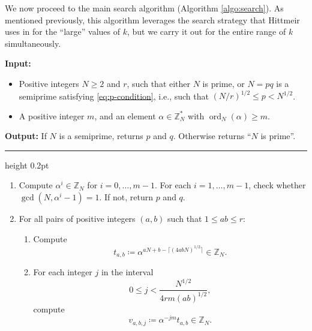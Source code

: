 \documentclass[reqno]{amsart}
\theoremstyle{remark}
\numberwithin{equation}{section}
\numberwithin{thm}{section}
\newcommand{\ZZ}{\mathbb{Z}}
\renewcommand{\leq}{\leqslant}
\renewcommand{\geq}{\geqslant}
\newcommand{\defeq}{\coloneqq}
\DeclareMathOperator{\ord}{ord}
\begin{document}
We now proceed to the main search algorithm (Algorithm \ref{algo:search}).
As mentioned previously, this algorithm leverages the search strategy that
Hittmeir uses in \cite{Hit-timespace} for the ``large'' values of $k$,
but we carry it out for the entire range of $k$ simultaneously.

\begin{myalgorithm}[ht]
\caption{-- the main search}
\label{algo:search}
\begin{flushleft}
\textbf{Input:}
\begin{itemize}[label=--,labelwidth=0.7cm,leftmargin=]
  \item Positive integers $N \geq 2$ and $r$,
  such that either $N$ is prime, or $N = pq$ is a semiprime
  satisfying \eqref{eq:p-condition},
  i.e., such that $(N/r)^{1/2} \leq p < N^{1/2}$.
  \item A positive integer $m$,
  and an element $\alpha \in \ZZ_N^*$ with $\ord_N(\alpha) \geq m$.
\end{itemize}
\textbf{Output:} If $N$ is a semiprime, returns $p$ and $q$. Otherwise returns ``$N$ is prime''.
\end{flushleft}
\vspace{2pt} \hrule height 0.2pt \vspace{1pt}
\begin{enumerate}[label=\arabic*),labelwidth=0.7cm,leftmargin=\labelwidth,itemsep=0.2em]
  \item
  Compute $\alpha^i \in \ZZ_N$ for $i = 0, \ldots, m-1$. 
  For each $i = 1, \ldots, m-1$, check whether $\gcd(N, \alpha^i - 1) = 1$.
  If not, return $p$ and $q$.
  
  \item
  For all pairs of positive integers $(a,b)$ such that $1 \leq ab \leq r$:
  \begin{enumerate}[label=\alph*),itemsep=0.2em]
    \item Compute
    \begin{equation}
    \label{eq:t-defn}
      t_{a,b} \defeq \alpha^{aN + b - \lceil (4abN)^{1/2} \rceil} \in \ZZ_N.
    \end{equation}

    \item
    For each integer $j$ in the interval
      \[ 0 \leq j < \frac{N^{1/2}}{4rm (ab)^{1/2}}, \]
    compute
    \begin{equation}
    \label{eq:v-defn}
      v_{a,b,j} \defeq \alpha^{-jm} t_{a,b} \in \ZZ_N.
    \end{equation}
  \end{enumerate}


\end{enumerate}
\end{myalgorithm}
\end{document}

